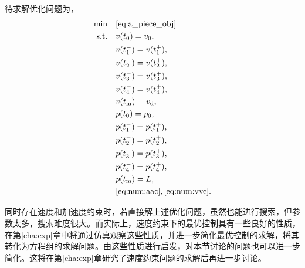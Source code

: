 待求解优化问题为，
\begin{align}
\min \quad& \eqref{eq:a_piece_obj}\quad\label{eq:num:aopt1}\\
\text{s.t.}
\quad& v(t_0)=v_0, \quad\\
\quad& v(t_1^-)=v(t_1^+), \quad\\
\quad& v(t_2^-)=v(t_2^+), \quad\\
\quad& v(t_3^-)=v(t_3^+), \quad\\
\quad& v(t_4^-)=v(t_4^+), \quad\\
\quad& v(t_\mathrm{m})=v_\mathrm{d}, \quad\\
\quad& p(t_0)=p_0, \quad\\
\quad& p(t_1^-)=p(t_1^+), \quad\\
\quad& p(t_2^-)=p(t_2^+), \quad\\
\quad& p(t_3^-)=p(t_3^+), \quad\\
\quad& p(t_4^-)=p(t_4^+), \quad\\
\quad& p(t_\mathrm{m})=L, \quad\\
\quad& \eqref{eq:num:aac},\eqref{eq:num:vvc}.\label{eq:num:aoptL}
\end{align}

同时存在速度和加速度约束时，若直接解上述优化问题，虽然也能进行搜索，但参数太多，搜索难度很大。而实际上，速度约束下的最优控制具有一些良好的性质，在第\ref{cha:exp}章中将通过仿真观察这些性质，并进一步简化最优控制的求解，将其转化为方程组的求解问题。由这些性质进行启发，对本节讨论的问题也可以进一步简化。这将在第\ref{cha:exp}章研究了速度约束问题的求解后再进一步讨论。



